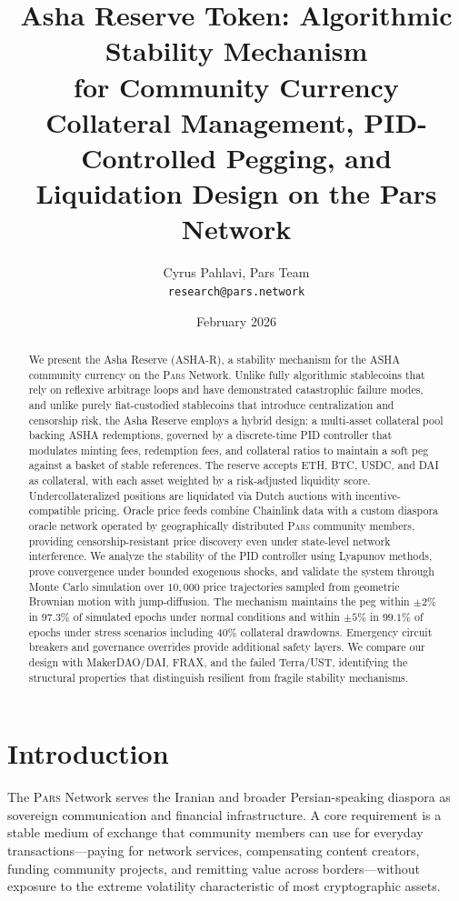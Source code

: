 \documentclass[11pt,a4paper]{article}
\title{Asha Reserve Token: Algorithmic Stability Mechanism\\for Community Currency\\[0.5em]
\large Collateral Management, PID-Controlled Pegging, and\\Liquidation Design on the Pars Network}
\author{
  Cyrus Pahlavi, Pars Team\\
  \texttt{research@pars.network}
}
\date{February 2026}
\newcommand{\Pars}{\textsc{Pars}\xspace}
\newcommand{\asha}{\textsc{ASHA}\xspace}
\newcommand{\ashares}{\textsc{ASHA-R}\xspace}
\begin{document}
\parscoverpage


\begin{abstract}
We present the Asha Reserve (\ashares), a stability mechanism for the \asha community currency on the \Pars Network.
Unlike fully algorithmic stablecoins that rely on reflexive arbitrage loops and have demonstrated catastrophic failure modes, and unlike purely fiat-custodied stablecoins that introduce centralization and censorship risk, the Asha Reserve employs a hybrid design: a multi-asset collateral pool backing \asha redemptions, governed by a discrete-time PID controller that modulates minting fees, redemption fees, and collateral ratios to maintain a soft peg against a basket of stable references.
The reserve accepts ETH, BTC, USDC, and DAI as collateral, with each asset weighted by a risk-adjusted liquidity score.
Undercollateralized positions are liquidated via Dutch auctions with incentive-compatible pricing.
Oracle price feeds combine Chainlink data with a custom diaspora oracle network operated by geographically distributed \Pars community members, providing censorship-resistant price discovery even under state-level network interference.
We analyze the stability of the PID controller using Lyapunov methods, prove convergence under bounded exogenous shocks, and validate the system through Monte Carlo simulation over $10{,}000$ price trajectories sampled from geometric Brownian motion with jump-diffusion.
The mechanism maintains the peg within $\pm 2\%$ in $97.3\%$ of simulated epochs under normal conditions and within $\pm 5\%$ in $99.1\%$ of epochs under stress scenarios including $40\%$ collateral drawdowns.
Emergency circuit breakers and governance overrides provide additional safety layers.
We compare our design with MakerDAO/DAI, FRAX, and the failed Terra/UST, identifying the structural properties that distinguish resilient from fragile stability mechanisms.
\end{abstract}

\tableofcontents

\newpage

\section{Introduction}
\label{sec:introduction}

The \Pars Network serves the Iranian and broader Persian-speaking diaspora as sovereign communication and financial infrastructure.
A core requirement is a stable medium of exchange that community members can use for everyday transactions---paying for network services, compensating content creators, funding community projects, and remitting value across borders---without exposure to the extreme volatility characteristic of most cryptographic assets.
\end{document}
